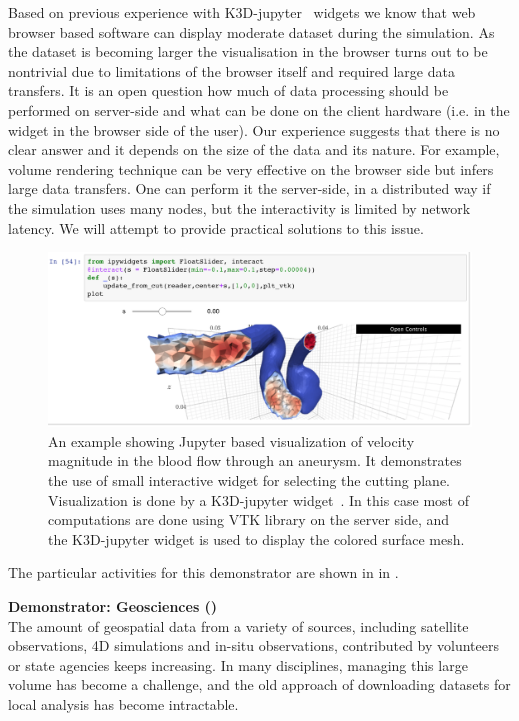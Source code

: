 Based on previous experience with K3D-jupyter~\cite{K3D}
widgets we know that web browser based software can display moderate
dataset during the simulation. As the dataset is becoming larger the
visualisation in the browser turns out to be nontrivial due to
limitations of the browser itself and required large data transfers. It is
an open question how much of data processing should be performed on
server-side and what can be done on the client hardware (i.e. in the
widget in the browser side of the user). Our
experience suggests that there is no clear answer and it depends on
the size of the data and its nature. For example, volume rendering
technique can be very effective on the browser side but infers large data
transfers. One can perform it the server-side, in a distributed way if
the simulation uses many nodes, but the interactivity is limited by
network latency. We will attempt to provide practical
solutions to this issue.
%
  \begin{figure}[ht!]\centering
  \includegraphics[width=.95\textwidth]{images/k3d_cfd.png}
  \caption{An example showing Jupyter based visualization of velocity
    magnitude in the blood flow through an aneurysm. It demonstrates
    the use of small interactive widget for selecting the cutting
    plane.
    Visualization is done by a K3D-jupyter widget~\cite{K3D}.
    In this case most of computations are done using VTK library on
    the server side, and the K3D-jupyter widget is used to display the
    colored surface mesh.
  }\label{fig:k3d-cfd}
  \end{figure}

    The particular activities for this demonstrator are shown in
   in .

\medskip
\noindent\textbf{Demonstrator: Geosciences ()}\label{sec:concept-demonstrators-geo}\\
The amount of geospatial data from a variety of sources, including satellite observations, 4D simulations and in-situ observations, contributed by volunteers
or state agencies keeps increasing. In many disciplines, managing this large volume
has become a challenge, and the old approach of downloading datasets for local
analysis has become intractable.

